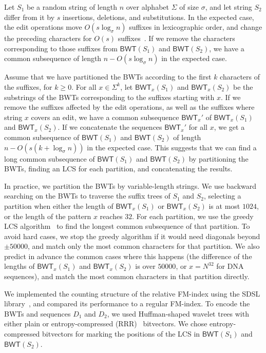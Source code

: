 \documentclass{llncs}
\newcommand{\BWT}
  {\ensuremath{\mathsf{BWT}}}
\begin{document}
Let $S_{1}$ be a random string of length $n$ over alphabet $\Sigma$ of size
$\sigma$, and let string $S_{2}$ differ from it by $s$ insertions, deletions,
and substitutions. In the expected case, the edit operations move $O(s
\log_{\sigma} n)$ suffixes in lexicographic order, and change the preceding
characters for $O(s)$ suffixes~\cite{MNSV10}. If we remove the characters
corresponding to those suffixes from $\BWT(S_{1})$ and $\BWT(S_{2})$, we have
a common subsequence of length $n - O(s \log_{\sigma} n)$ in the expected
case.

Assume that we have partitioned the BWTs according to the first $k$
characters of the suffixes, for $k \ge 0$. For all $x \in \Sigma^{k}$, let
$\BWT_{x}(S_{1})$ and $\BWT_{x}(S_{2})$ be the substrings of the BWTs
corresponding to the suffixes starting with $x$. If we remove the suffixes
affected by the edit operations, as well as the suffixes where string $x$
covers an edit, we have a common subsequence $\BWT_{x}'$ of $\BWT_{x}(S_{1})$
and $\BWT_{x}(S_{2})$. If we concatenate the sequences $\BWT_{x}'$ for all
$x$, we get a common subsequence of $\BWT(S_{1})$ and $\BWT(S_{2})$ of length
$n - O(s (k + \log_{\sigma} n))$ in the expected case. This suggests that we
can find a long common subsequence of $\BWT(S_{1})$ and $\BWT(S_{2})$ by
partitioning the BWTs, finding an LCS for each partition, and concatenating the
results.

In practice, we partition the BWTs by variable-length strings. We use
backward searching on the BWTs to traverse the suffix trees of $S_{1}$ and
$S_{2}$, selecting a partition when either the length of $\BWT_{x}(S_{1})$ or
$\BWT_{x}(S_{2})$ is at most $1024$, or the length of the pattern $x$ reaches
$32$. For each partition, we use the greedy LCS algorithm~\cite{Myers86} to
find the longest common subsequence of that partition. To avoid hard cases,
we stop the greedy algorithm if it would need diagonals beyond $\pm 50000$,
and match only the most common characters for that partition. We also predict
in advance the common cases where this happens (the difference of the lengths
of $\BWT_{x}(S_{1})$ and $\BWT_{x}(S_{2})$ is over $50000$, or $x = N^{32}$
for DNA sequences), and match the most common characters in that partition
directly.


We implemented the counting structure of the relative FM-index using the SDSL
library~\cite{Gog2014b}, and compared its performance to a regular FM-index.
To encode the BWTs and sequences $D_{1}$ and $D_{2}$, we used Huffman-shaped
wavelet trees with either plain or entropy-compressed (RRR)~\cite{Raman2007}
bitvectors. We chose entropy-compressed bitvectors for marking the positions
of the LCS in $\BWT(S_{1})$ and $\BWT(S_{2})$.
\end{document}

